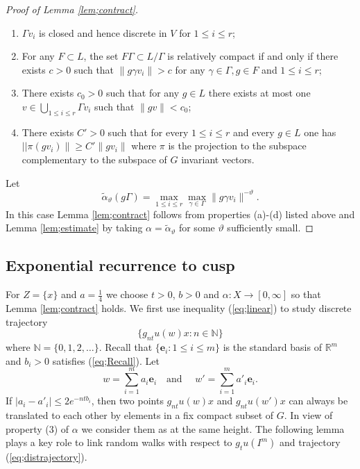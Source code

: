 \documentclass[12pt]{amsart}
\theoremstyle{definition}
\theoremstyle{remark}
\numberwithin{equation}{section}
\begin{document}
\begin{proof}[Proof of Lemma \ref{lem;contract}]
\begin{enumerate}[label=(\alph*)]
\item $\Gamma v_i$ is closed and hence discrete in $V$ for $1\le i\le r$;
\item For any $F\subset L$, the set $F\Gamma\subset L/\Gamma$ is relatively compact if and only if 
there exists $c>0$ such that $\|g\gamma v_i\|>c$ for any $\gamma\in \Gamma, g\in F$
 and $1\le i\le r$;
\item There exists $c_0>0$ such that for 
any $g\in L$ there exists at most one $v\in \bigcup_{1\le i \le r} \Gamma v_i$  such that $\|gv\|<c_0$;
\item There exists $C'>0$ such that for every $1\le i\le r$ and every $g\in L$ one has
 $||\pi (gv_i)\|\ge C'\|gv_i\|$ where $\pi$ is the projection to the subspace  complementary  to the subspace of
  $G$
 invariant vectors.
\end{enumerate}
Let
\[
\tilde \alpha_\vartheta(g\Gamma)=\max_{1\le i\le r}\max_{\gamma\in \Gamma}\|g\gamma v_i\|^{-\vartheta}.
\]
In this case
Lemma 
\ref{lem;contract}
follows from  properties (a)-(d) listed above and 
Lemma \ref{lem;estimate} by taking $\alpha=\tilde \alpha_\vartheta$ for some  $\vartheta $ sufficiently small.
\end{proof}

\subsection{Exponential recurrence to cusp}\label{s;rec}
For $Z=\{x\}$ and $a=\frac{1}{4}$ we  choose $t>0$, $b>0$ and $\alpha:X\to [0, \infty]$ so that
Lemma \ref{lem;contract} holds. 
We first  use inequality (\ref{eq;linear}) to study discrete  trajectory
\begin{equation}\label{eq;distrajectory}
\{g_{nt}u(w)x:  n\in \mathbb N\}
\end{equation}
where $\mathbb N=\{0, 1, 2, \ldots\}$.
Recall that $\{\mathbf e_i: 1\le i\le m\}$ is the standard basis of $\mathbb R^m$ and $b_i>0$ satisfies 
(\ref{eq;Recall}). Let 
\[
w=\sum_{i=1}^m a_i\mathbf e_i\quad \mbox{and }\quad w'=\sum_{i=1}^m a'_i \mathbf e_i.
\]
If $|a_i-a'_i|\le  2e^{-ntb_i}$, then two points
 $g_{nt}u(w)x$ and $g_{nt}u(w')x$
 can always be translated to each other by elements in a fix compact subset of $G$.
In view of property (3) of $\alpha$ we consider them as at the same height. 
The following lemma plays a key role to link random walks with respect to $g_tu(I^m)$ and
 trajectory  (\ref{eq;distrajectory}).
\end{document}
